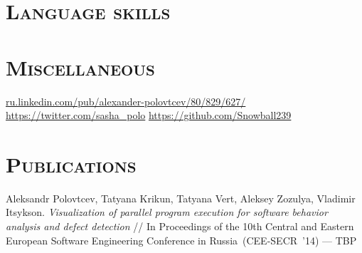 \documentclass[12pt,a4paper]{moderncv}
\begin{document}
\section{\textsc{Language skills}}
%


\section{\textsc{Miscellaneous}}
%
       {{\color{see}\url{ru.linkedin.com/pub/alexander-polovtcev/80/829/627/}}}
       {{\color{see}\url{https://twitter.com/sasha_polo}}}
       {{\color{see}\url{https://github.com/Snowball239}}}


\section{\textsc{Publications}}
%
       {Aleksandr Polovtcev, Tatyana Krikun, Tatyana Vert, Aleksey Zozulya, Vladimir Itsykson.
\textit{Visualization of parallel program execution for software behavior analysis and defect detection}
        // In Proceedings of the 10th Central and Eastern European Software
        Engineering Conference in Russia~(CEE-SECR~'14)
        --- TBP}
\end{document}
